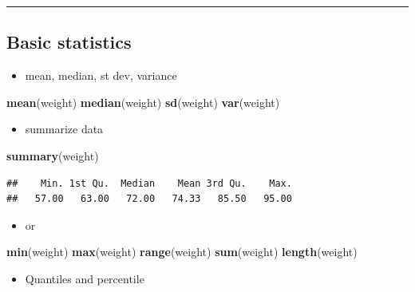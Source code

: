 \documentclass[]{article}
\def\tightlist{}
\newenvironment{Shaded}{\begin{snugshade}}{\end{snugshade}}
\newcommand{\KeywordTok}[1]{\textcolor[rgb]{0.13,0.29,0.53}{\textbf{{#1}}}}
\newcommand{\NormalTok}[1]{{#1}}
\numberwithin{equation}{section}
\begin{document}
\begin{center}\rule{0.5\linewidth}{\linethickness}\end{center}

\subsection{Basic statistics}\label{basic-statistics}

\begin{itemize}
\tightlist
\item
  mean, median, st dev, variance
\end{itemize}

\begin{Shaded}
\begin{Highlighting}[]
\KeywordTok{mean}\NormalTok{(weight) }
\KeywordTok{median}\NormalTok{(weight)}
\KeywordTok{sd}\NormalTok{(weight)}
\KeywordTok{var}\NormalTok{(weight)}
\end{Highlighting}
\end{Shaded}

\begin{itemize}
\tightlist
\item
  summarize data
\end{itemize}

\begin{Shaded}
\begin{Highlighting}[]
\KeywordTok{summary}\NormalTok{(weight)}
\end{Highlighting}
\end{Shaded}

\begin{verbatim}
##    Min. 1st Qu.  Median    Mean 3rd Qu.    Max. 
##   57.00   63.00   72.00   74.33   85.50   95.00
\end{verbatim}

\begin{itemize}
\tightlist
\item
  or
\end{itemize}

\begin{Shaded}
\begin{Highlighting}[]
\KeywordTok{min}\NormalTok{(weight)}
\KeywordTok{max}\NormalTok{(weight)}
\KeywordTok{range}\NormalTok{(weight)}
\KeywordTok{sum}\NormalTok{(weight)}
\KeywordTok{length}\NormalTok{(weight)}
\end{Highlighting}
\end{Shaded}

\begin{itemize}
\tightlist
\item
  Quantiles and percentile
\end{itemize}
\end{document}
